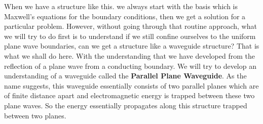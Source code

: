 When we have a structure like this. we always start with the basis which is Maxwell's equations for the boundary conditions, then we get a solution for a particular problem. However, without going through that routine approach, what we will try to do first is to understand if we still confine ourselves to the uniform plane wave boundaries, can we get a structure like a waveguide structure? That is what we shall do here. With the understanding that we have developed from the reflection of a plane wave from a conducting boundary. We will try to develop an understanding of a waveguide called the \textbf{Parallel Plane Waveguide}. As the name suggests, this waveguide essentially consists of two parallel planes which are of finite distance apart and electromagnetic energy is trapped between these two plane waves. So the energy essentially propagates along this structure trapped between two planes.

